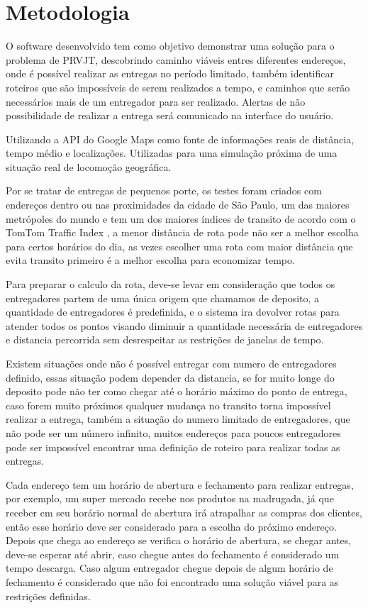 \chapter{Metodologia}
O software desenvolvido tem como objetivo demonstrar uma solução para o problema de PRVJT, descobrindo caminho viáveis entres diferentes endereços, onde é possível realizar as entregas no período limitado, também identificar roteiros que são impossíveis de serem realizados a tempo, e caminhos que serão necessários mais de um entregador para ser realizado. Alertas de não possibilidade de realizar a entrega será comunicado na interface do usuário.

Utilizando a API do Google Maps\cite{GoogleMatrix} como fonte de informações reais de distância, tempo médio e localizações. Utilizadas para uma simulação próxima de uma situação real de locomoção geográfica.

Por se tratar de entregas de pequenos porte, os testes foram criados com endereços dentro ou nas proximidades da cidade de São Paulo, um das maiores metrópoles do mundo e tem um dos maiores índices de transito de acordo com o TomTom Traffic Index \cite{TomTom}, a menor distância de rota pode não ser a melhor escolha para certos horários do dia, as vezes escolher uma rota com maior distância que evita transito primeiro é a melhor escolha para economizar tempo.

Para preparar o calculo da rota, deve-se levar em consideração que todos os entregadores partem de uma única origem que chamamos de deposito, a quantidade de entregadores é predefinida, e o sistema ira devolver rotas para atender todos os pontos visando diminuir a quantidade necessária de entregadores e distancia percorrida sem desrespeitar as restrições de janelas de tempo.

Existem situações onde não é possível entregar com numero de entregadores definido, essas situação podem depender da distancia, se for muito longe do deposito pode não ter como chegar até o horário máximo do ponto de entrega, caso forem muito próximos qualquer mudança no transito torna impossível realizar a entrega, também a situação do numero limitado de entregadores, que não pode ser um número infinito, muitos endereços para poucos entregadores pode ser impossível encontrar uma definição de roteiro para realizar todas as entregas.

Cada endereço tem um horário de abertura e fechamento para realizar entregas, por exemplo, um super mercado recebe nos produtos na madrugada, já que receber em seu horário normal de abertura irá atrapalhar as compras dos clientes, então esse horário deve ser considerado para a escolha do próximo endereço. 
Depois que chega ao endereço se verifica o horário de abertura, se chegar antes, deve-se esperar até abrir, caso chegue antes do fechamento é considerado um tempo descarga. Caso algum entregador chegue depois de algum horário de fechamento é considerado que não foi encontrado uma solução viável para as restrições definidas.

